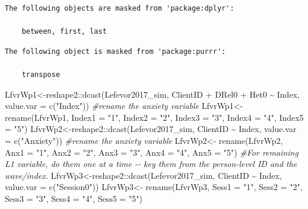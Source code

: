 \documentclass[
  11pt,
]{book}
\newenvironment{Shaded}{\begin{snugshade}}{\end{snugshade}}
\newcommand{\AttributeTok}[1]{\textcolor[rgb]{0.77,0.63,0.00}{#1}}
\newcommand{\CommentTok}[1]{\textcolor[rgb]{0.56,0.35,0.01}{\textit{#1}}}
\newcommand{\FunctionTok}[1]{\textcolor[rgb]{0.00,0.00,0.00}{#1}}
\newcommand{\NormalTok}[1]{#1}
\newcommand{\OtherTok}[1]{\textcolor[rgb]{0.56,0.35,0.01}{#1}}
\newcommand{\SpecialCharTok}[1]{\textcolor[rgb]{0.00,0.00,0.00}{#1}}
\newcommand{\StringTok}[1]{\textcolor[rgb]{0.31,0.60,0.02}{#1}}
\begin{document}
\begin{verbatim}
The following objects are masked from 'package:dplyr':

    between, first, last
\end{verbatim}

\begin{verbatim}
The following object is masked from 'package:purrr':

    transpose
\end{verbatim}

\begin{Shaded}
\begin{Highlighting}[]
\NormalTok{LfvrWp1}\OtherTok{\textless{}{-}}\NormalTok{reshape2}\SpecialCharTok{::}\FunctionTok{dcast}\NormalTok{(Lefevor2017\_sim, ClientID }\SpecialCharTok{+}\NormalTok{ DRel0 }\SpecialCharTok{+}\NormalTok{ Het0 }\SpecialCharTok{\textasciitilde{}}\NormalTok{ Index, }\AttributeTok{value.var =} \FunctionTok{c}\NormalTok{(}\StringTok{"Index"}\NormalTok{))}
\CommentTok{\#rename the anxiety variable}
\NormalTok{LfvrWp1}\OtherTok{\textless{}{-}}  \FunctionTok{rename}\NormalTok{(LfvrWp1, }\AttributeTok{Index1 =} \StringTok{"1"}\NormalTok{, }\AttributeTok{Index2 =} \StringTok{"2"}\NormalTok{, }\AttributeTok{Index3 =} \StringTok{"3"}\NormalTok{, }\AttributeTok{Index4 =} \StringTok{"4"}\NormalTok{, }\AttributeTok{Index5 =} \StringTok{"5"}\NormalTok{)}
\NormalTok{LfvrWp2}\OtherTok{\textless{}{-}}\NormalTok{reshape2}\SpecialCharTok{::}\FunctionTok{dcast}\NormalTok{(Lefevor2017\_sim, ClientID }\SpecialCharTok{\textasciitilde{}}\NormalTok{ Index, }\AttributeTok{value.var =} \FunctionTok{c}\NormalTok{(}\StringTok{"Anxiety"}\NormalTok{))}
\CommentTok{\#rename the anxiety variable}
\NormalTok{LfvrWp2}\OtherTok{\textless{}{-}}  \FunctionTok{rename}\NormalTok{(LfvrWp2, }\AttributeTok{Anx1 =} \StringTok{"1"}\NormalTok{, }\AttributeTok{Anx2 =} \StringTok{"2"}\NormalTok{, }\AttributeTok{Anx3 =} \StringTok{"3"}\NormalTok{, }\AttributeTok{Anx4 =} \StringTok{"4"}\NormalTok{, }\AttributeTok{Anx5 =} \StringTok{"5"}\NormalTok{)}
\CommentTok{\#For remaining L1 variable, do them one at a time {-}{-} key them from the person{-}level ID and the wave/index.}
\NormalTok{LfvrWp3}\OtherTok{\textless{}{-}}\NormalTok{reshape2}\SpecialCharTok{::}\FunctionTok{dcast}\NormalTok{(Lefevor2017\_sim, ClientID }\SpecialCharTok{\textasciitilde{}}\NormalTok{ Index, }\AttributeTok{value.var =} \FunctionTok{c}\NormalTok{(}\StringTok{"Session0"}\NormalTok{))}
\NormalTok{LfvrWp3}\OtherTok{\textless{}{-}}  \FunctionTok{rename}\NormalTok{(LfvrWp3, }\AttributeTok{Sess1 =} \StringTok{"1"}\NormalTok{, }\AttributeTok{Sess2 =} \StringTok{"2"}\NormalTok{, }\AttributeTok{Sess3 =} \StringTok{"3"}\NormalTok{, }\AttributeTok{Sess4 =} \StringTok{"4"}\NormalTok{, }\AttributeTok{Sess5 =} \StringTok{"5"}\NormalTok{)}

\end{Highlighting}
\end{Shaded}
\end{document}
